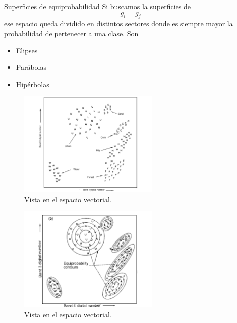 \documentclass[]{beamer}
\begin{document}
\begin{frame}{\subsecname}
  \begin{block}{Superficies de equiprobabilidad}
    Si buscamos la superficies de $$g_i = g_j$$ ese espacio queda dividido en distintos sectores donde es siempre mayor la probabilidad de pertenecer a una clase.
    \pause
    Son
    \begin{itemize}[<+>]
      \item Elipses
      \item Parábolas
      \item Hipérbolas
    \end{itemize}
  \end{block}
\end{frame}

\begin{frame}{\subsecname}
  \begin{figure}
  \includegraphics[width=0.6\textwidth]{imagenes/areas.png}
  \caption{Vista en el espacio vectorial.}
  \end{figure}
\end{frame}

\begin{frame}{\subsecname}
  \begin{figure}
  \includegraphics[width=0.6\textwidth]{imagenes/max.png}
  \caption{Vista en el espacio vectorial.}
  \end{figure}
\end{frame}
\end{document}
